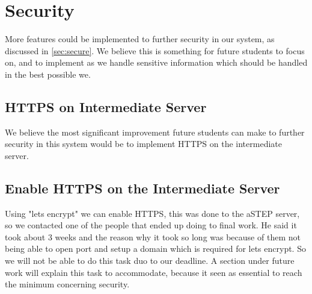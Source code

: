 \section{Security}\label{sec:fucture_secure}
More features could be implemented to further security in our system, as discussed in \cref{sec:secure}. We believe this is something for future students to focus on, and to implement as we handle sensitive information which should be handled in the best possible we.

\subsection{HTTPS on Intermediate Server}
We believe the most significant improvement future students can make to further security in this system would be to implement HTTPS on the intermediate server.
\subsection*{Enable HTTPS on the Intermediate Server}
Using "lets encrypt" we can enable HTTPS, this was done to the aSTEP server, so we contacted one of the people that ended up doing to final work. He said it took about 3 weeks and the reason why it took so long was because of them not being able to open port and setup a domain which is required for lets encrypt. So we will not be able to do this task duo to our deadline. A section under future work will explain this task to accommodate, because it seen as essential to reach the minimum concerning security.
